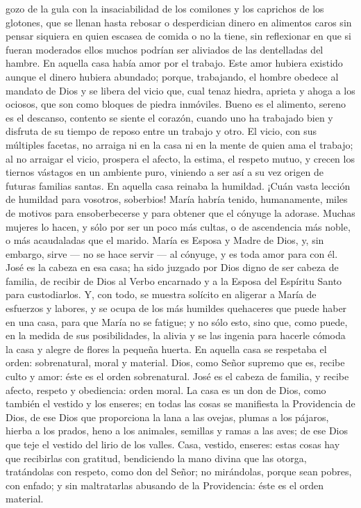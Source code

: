 \documentclass[12pt]{book} %
\begin{document}
gozo de la gula con la insaciabilidad de los comilones y los caprichos de los glotones, que se llenan hasta rebosar o desperdician dinero en alimentos caros sin pensar siquiera en quien escasea de comida o no la tiene, sin reflexionar en que si fueran moderados ellos muchos podrían ser aliviados de las dentelladas del hambre. 
En aquella casa había amor por el trabajo. Este amor hubiera existido aunque el dinero hubiera abundado; porque, 
trabajando, el hombre obedece al mandato de Dios y se libera del vicio que, cual tenaz hiedra, aprieta y ahoga a los ociosos, que son como bloques de piedra inmóviles. Bueno es el alimento, sereno es el descanso, contento se siente el corazón, cuando uno ha trabajado bien y disfruta de su tiempo de reposo entre un trabajo y otro. El vicio, con sus múltiples facetas, no arraiga ni en la casa ni en la mente de quien ama el trabajo; al no arraigar el vicio, prospera el afecto, la estima, el respeto mutuo, y crecen los tiernos vástagos en un ambiente puro, viniendo a ser así a su vez origen de futuras familias santas. 
En aquella casa reinaba la humildad. ¡Cuán vasta lección de humildad para vosotros, soberbios! María habría tenido, humanamente, miles de motivos para ensoberbecerse y para obtener que el cónyuge la adorase. Muchas mujeres lo hacen, y sólo por ser un poco más cultas, o de ascendencia más noble, o más acaudaladas que el marido. María es Esposa y Madre de Dios, y, sin embargo, sirve — no se hace servir — al cónyuge, y es toda amor para con él. José es la cabeza en esa casa; ha sido juzgado por Dios digno de ser cabeza de familia, de recibir de Dios al Verbo encarnado y a la Esposa del Espíritu Santo para custodiarlos. Y, con todo, se muestra solícito en aligerar a María de esfuerzos y labores, y se ocupa de los más humildes quehaceres que puede haber en una casa, para que María no se fatigue; y no sólo esto, sino que, como puede, en la medida de sus posibilidades, la alivia y se las ingenia para hacerle cómoda la casa y alegre de flores la pequeña huerta.                 
En aquella casa se respetaba el orden: sobrenatural, moral y material. Dios, como Señor supremo que es, recibe culto y 
amor: éste es el orden sobrenatural. José es el cabeza de familia, y recibe afecto, respeto y obediencia: orden moral. La casa es un don de Dios, como también el vestido y los enseres; en todas las cosas se manifiesta la Providencia de Dios, de ese Dios que proporciona la lana a las ovejas, plumas a los pájaros, hierba a los prados, heno a los animales, semillas y ramas a las aves; de ese Dios que teje el vestido del lirio de los valles. Casa, vestido, enseres: estas cosas hay que recibirlas con gratitud, bendiciendo la mano divina que las otorga, tratándolas con respeto, como don del Señor; no mirándolas, porque sean pobres, con enfado; y sin maltratarlas abusando de la Providencia: éste es el orden material. 
\end{document}

